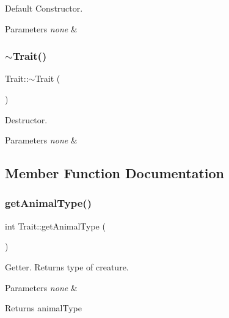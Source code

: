 Default Constructor. 
\begin{DoxyParams}{Parameters}
{\em none} & \\
\hline
\end{DoxyParams}
\mbox{\label{class_trait_a28ec215ff3fac94d1657088fee6007a4}} 
\subsubsection{\texorpdfstring{$\sim$\+Trait()}{~Trait()}}
{\footnotesize\ttfamily Trait\+::$\sim$\+Trait (\begin{DoxyParamCaption}{ }\end{DoxyParamCaption})\hspace{0.3cm}{\ttfamily [virtual]}}

Destructor. 
\begin{DoxyParams}{Parameters}
{\em none} & \\
\hline
\end{DoxyParams}


\subsection{Member Function Documentation}
\mbox{\label{class_trait_ac1bcf9cebceb67efe5c60cf04f85a383}} 
\subsubsection{\texorpdfstring{get\+Animal\+Type()}{getAnimalType()}}
{\footnotesize\ttfamily int Trait\+::get\+Animal\+Type (\begin{DoxyParamCaption}{ }\end{DoxyParamCaption})}

Getter. Returns type of creature. 
\begin{DoxyParams}{Parameters}
{\em none} & \\
\hline
\end{DoxyParams}
\begin{DoxyReturn}{Returns}
animal\+Type 
\end{DoxyReturn}
\mbox{\label{class_trait_a28ded6c3488a3e8704173bf039bfa936}} 

